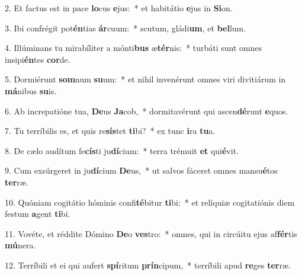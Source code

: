 2. Et factus est in pace \textbf{lo}cus \textbf{e}jus:~*  et habitátio \textbf{e}jus in \textbf{Si}on.\

3. Ibi confrégit pot\textbf{én}tias \textbf{ár}cuum:~*  scutum, gládi\textbf{um}, et \textbf{bel}lum.\

4. Illúminans tu mirabíliter a mónti\textbf{bus} æ\textbf{tér}nis:~*  turbáti sunt omnes insipi\textbf{én}tes \textbf{cor}de.\

5. Dormiérunt \textbf{som}num \textbf{su}um:~*  et nihil invenérunt omnes viri divitiárum in \textbf{má}nibus \textbf{su}is.\

6. Ab increpatióne tua, \textbf{De}us \textbf{Ja}cob,~*  dormitavérunt qui ascen\textbf{dé}runt \textbf{e}quos.\

7. Tu terríbilis es, et quis re\textbf{sís}tet \textbf{ti}bi?~*  ex tunc \textbf{i}ra \textbf{tu}a.\

8. De cælo audítum fe\textbf{cís}ti ju\textbf{dí}cium:~*  terra trémuit \textbf{et} qui\textbf{é}vit.\

9. Cum exsúrgeret in ju\textbf{dí}cium \textbf{De}us,~*  ut salvos fáceret omnes mansu\textbf{é}tos \textbf{ter}ræ.\

10. Quóniam cogitátio hóminis confi\textbf{té}bitur \textbf{ti}bi:~*  et relíquiæ cogitatiónis diem festum \textbf{a}gent \textbf{ti}bi.\

11. Vovéte, et réddite Dómino \textbf{De}o \textbf{ves}tro:~*  omnes, qui in circúitu ejus af\textbf{fér}tis \textbf{mú}nera.\

12. Terríbili et ei qui aufert \textbf{spí}ritum \textbf{prín}cipum,~*  terríbili apud \textbf{re}ges \textbf{ter}ræ.\

